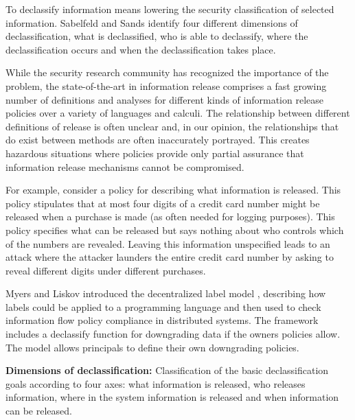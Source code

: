 To declassify information means lowering the security classification of selected information. Sabelfeld and Sands \cite{ref_3_sabelfeld2009declassification} identify four different dimensions of declassification, what is declassified, who is able to declassify, where the declassification occurs and when the declassification takes place.

While the security research community has recognized the importance of the problem, the state-of-the-art in information release comprises a fast growing number of definitions and analyses for different kinds of information release policies over a variety of languages and calculi. The relationship between different definitions of release is often unclear and, in our opinion, the relationships that do exist between methods are
often inaccurately portrayed. This creates hazardous situations where policies provide only partial assurance that information release mechanisms cannot be compromised.

For example, consider a policy for describing what information is released. This policy stipulates that at most four digits of a credit card number might be released when a purchase is made (as often needed for logging purposes). This policy specifies what can be released but says nothing about who controls which of the numbers are revealed.
Leaving this information unspecified leads to an attack where the attacker launders the entire credit card number by asking to reveal different digits under different purchases.

Myers and Liskov introduced the decentralized label model \cite{ref_4_myers2000protecting}, describing how labels could be applied
to a programming language and then used to check information
flow policy compliance in distributed systems. The framework
includes a declassify function for downgrading data if the
owners policies allow. The model allows principals to define their own downgrading policies.

\textbf{Dimensions of declassification:}
Classification of the basic declassification goals according to four axes: what information is released, who releases information, where in the system information is released and when information can be released.


